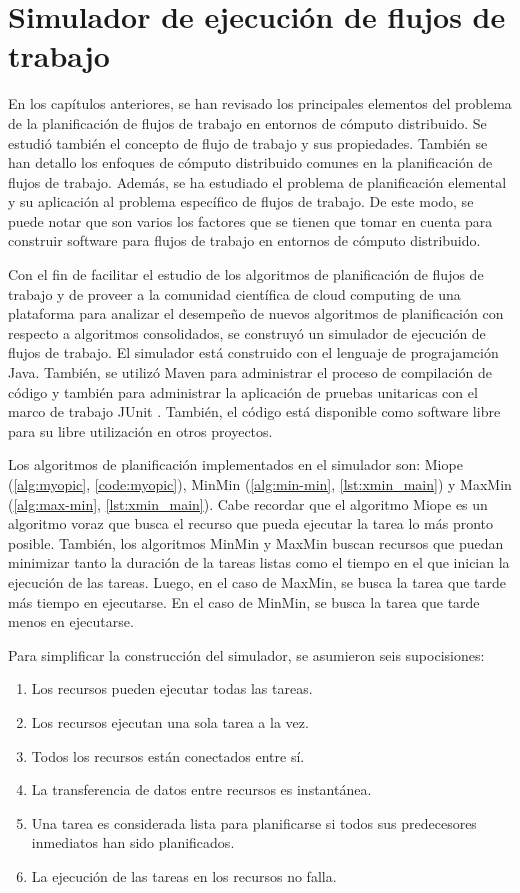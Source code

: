 \chapter[Simulador]{Simulador de ejecución de flujos de trabajo}

En los capítulos anteriores, se han revisado los principales elementos del problema de la planificación de flujos de trabajo en entornos de cómputo distribuido. Se estudió también el concepto de flujo de trabajo y sus propiedades. También se han detallo los enfoques de cómputo distribuido comunes en la planificación de flujos de trabajo. Además, se ha estudiado el problema de planificación elemental y su aplicación al problema específico de flujos de trabajo. De este modo, se puede notar que son varios los factores que se tienen que tomar en cuenta para construir software para flujos de trabajo en entornos de cómputo distribuido.

Con el fin de facilitar el estudio de los algoritmos de planificación de flujos de trabajo y de proveer a la comunidad científica de cloud computing de una plataforma para analizar el desempeño de nuevos algoritmos de planificación con respecto a algoritmos consolidados, se construyó un simulador de ejecución de flujos de trabajo. El simulador está construido con el lenguaje de prograjamción Java. También, se utilizó Maven \cite{maven2014} para administrar el proceso de compilación de código y también para administrar la aplicación de pruebas unitaricas con el marco de trabajo JUnit \cite{junit2014}. También, el código está disponible como software libre \cite{dominofire2014workflowsimulator} para su libre utilización en otros proyectos.

Los algoritmos de planificación implementados en el simulador son: Miope (\ref{alg:myopic}, \ref{code:myopic}), MinMin (\ref{alg:min-min}, \ref{lst:xmin_main}) y MaxMin (\ref{alg:max-min}, \ref{lst:xmin_main}). Cabe recordar que el algoritmo Miope es un algoritmo voraz que busca el recurso que pueda ejecutar la tarea lo más pronto posible. También, los algoritmos MinMin y MaxMin buscan recursos que puedan minimizar tanto la duración de la tareas listas como el tiempo en el que inician la ejecución de las tareas. Luego, en el caso de MaxMin, se busca la tarea que tarde más tiempo en ejecutarse. En el caso de MinMin, se busca la tarea que tarde menos en ejecutarse.

Para simplificar la construcción del simulador, se asumieron seis supocisiones:

\begin{enumerate}
\item Los recursos pueden ejecutar todas las tareas.
\item Los recursos ejecutan una sola tarea a la vez.
\item Todos los recursos están conectados entre sí.
\item La transferencia de datos entre recursos es instantánea.
\item Una tarea es considerada lista para planificarse si todos sus predecesores inmediatos han sido planificados.
\item La ejecución de las tareas en los recursos no falla.
\end{enumerate}

